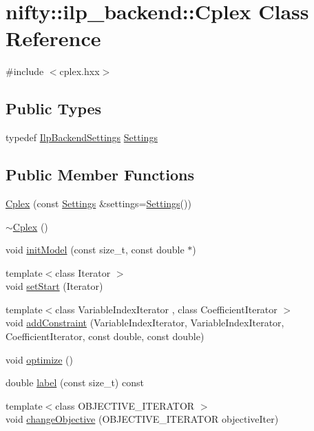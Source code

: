 \hypertarget{classnifty_1_1ilp__backend_1_1Cplex}{}\section{nifty\+:\+:ilp\+\_\+backend\+:\+:Cplex Class Reference}
\label{classnifty_1_1ilp__backend_1_1Cplex}


{\ttfamily \#include $<$cplex.\+hxx$>$}

\subsection*{Public Types}
\begin{DoxyCompactItemize}
\item 
typedef \hyperlink{structnifty_1_1ilp__backend_1_1IlpBackendSettings}{Ilp\+Backend\+Settings} \hyperlink{classnifty_1_1ilp__backend_1_1Cplex_a849b79eb66fde62dd0aa59e1cd919e9a}{Settings}
\end{DoxyCompactItemize}
\subsection*{Public Member Functions}
\begin{DoxyCompactItemize}
\item 
\hyperlink{classnifty_1_1ilp__backend_1_1Cplex_acbdd1f01db0d92354a2e1ec0a4da6028}{Cplex} (const \hyperlink{classnifty_1_1ilp__backend_1_1Cplex_a849b79eb66fde62dd0aa59e1cd919e9a}{Settings} \&settings=\hyperlink{classnifty_1_1ilp__backend_1_1Cplex_a849b79eb66fde62dd0aa59e1cd919e9a}{Settings}())
\item 
\hyperlink{classnifty_1_1ilp__backend_1_1Cplex_a5bebd6813a2fbb17fa2b5532c3d21000}{$\sim$\+Cplex} ()
\item 
void \hyperlink{classnifty_1_1ilp__backend_1_1Cplex_a52a0ed3e137e56d17daaaf4542d3290c}{init\+Model} (const size\+\_\+t, const double $\ast$)
\item 
{\footnotesize template$<$class Iterator $>$ }\\void \hyperlink{classnifty_1_1ilp__backend_1_1Cplex_a1c773d38cf7a0434247a87ee96531c57}{set\+Start} (Iterator)
\item 
{\footnotesize template$<$class Variable\+Index\+Iterator , class Coefficient\+Iterator $>$ }\\void \hyperlink{classnifty_1_1ilp__backend_1_1Cplex_ac1aca9700667959bb0d99c55ffec16ed}{add\+Constraint} (Variable\+Index\+Iterator, Variable\+Index\+Iterator, Coefficient\+Iterator, const double, const double)
\item 
void \hyperlink{classnifty_1_1ilp__backend_1_1Cplex_aa0055358a4aef6b8b660c14422500b23}{optimize} ()
\item 
double \hyperlink{classnifty_1_1ilp__backend_1_1Cplex_aded72f7962341ae66e4a72c2ef463015}{label} (const size\+\_\+t) const 
\item 
{\footnotesize template$<$class O\+B\+J\+E\+C\+T\+I\+V\+E\+\_\+\+I\+T\+E\+R\+A\+T\+O\+R $>$ }\\void \hyperlink{classnifty_1_1ilp__backend_1_1Cplex_a38bae82b8a54d28471ceb44514bfba18}{change\+Objective} (O\+B\+J\+E\+C\+T\+I\+V\+E\+\_\+\+I\+T\+E\+R\+A\+T\+O\+R objective\+Iter)
\end{DoxyCompactItemize}
